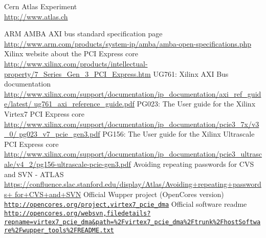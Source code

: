 \begin{thebibliography}{9}
  Cern Atlas Experiment\\
  \href{http://www.atlas.ch}{http://www.atlas.ch}

  ARM AMBA AXI bus standard specification page\\
  \href{http://www.arm.com/products/system-ip/amba/amba-open-specifications.php}{http://www.arm.com/products/system-ip/amba/amba-open-specifications.php}
  Xilinx website about the PCI Express core\\
  \href{http://www.xilinx.com/products/intellectual-property/7_Series_Gen_3_PCI_Express.htm}{http://www.xilinx.com/products/intellectual-property/7\_Series\_Gen\_3\_PCI\_Express.htm}
  UG761: Xilinx AXI Bus documentation\\
  \href{http://www.xilinx.com/support/documentation/ip_documentation/axi_ref_guide/latest/ug761_axi_reference_guide.pdf}{http://www.xilinx.com/support/documentation/ip\_documentation/axi\_ref\_guide/latest/ ug761\_axi\_reference\_guide.pdf}
  PG023: The User guide for the Xilinx Virtex7 PCI Express core\\
  \href{http://www.xilinx.com/support/documentation/ip_documentation/pcie3_7x/v3_0/pg023_v7_pcie_gen3.pdf}{http://www.xilinx.com/support/documentation/ip\_documentation/pcie3\_7x/v3\_0/ pg023\_v7\_pcie\_gen3.pdf}
  PG156: The User guide for the Xilinx Ultrascale PCI Express core \\
  \href{http://www.xilinx.com/support/documentation/ip_documentation/pcie3_ultrascale/v4_2/pg156-ultrascale-pcie-gen3.pdf}{http://www.xilinx.com/support/documentation/ip\_documentation/pcie3\_ultrascale/v4\_2/pg156-ultrascale-pcie-gen3.pdf}
  Avoiding repeating passwords for CVS and SVN - ATLAS\\
  \href{https://confluence.slac.stanford.edu/display/Atlas/Avoiding+repeating+passwords+for+CVS+and+SVN}{https://confluence.slac.stanford.edu/display/Atlas/Avoiding+repeating+passwords+ for+CVS+and+SVN}
  Official Wupper project (OpenCores version)\\
  \href{http://opencores.org/project,virtex7_pcie_dma}{\nolinkurl{http://opencores.org/project,virtex7\_pcie\_dma}}
  Official software readme\\
  \href{http://opencores.org/websvn,filedetails?repname=virtex7\_pcie\_dma&path=\%2Fvirtex7_pcie_dma\%2Ftrunk\%2FhostSoftware\%2Fwupper_tools\%2FREADME.txt}{\nolinkurl{http://opencores.org/websvn,filedetails?repname=virtex7_pcie_dma&path=\%2Fvirtex7_pcie_dma\%2Ftrunk\%2FhostSoftware\%2Fwupper_tools\%2FREADME.txt}}

\end{thebibliography}
